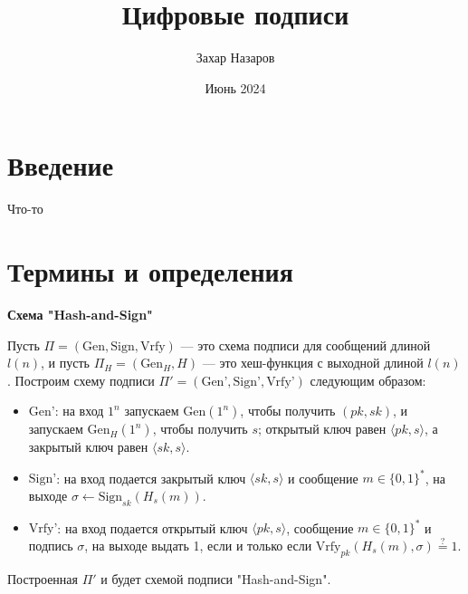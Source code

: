\documentclass[colorthm]{./civarticle}
\title{Цифровые подписи}
\author{Захар Назаров}
\date{Июнь 2024}
\begin{document}
\section{Введение}
Что-то

\section{Термины и определения}

\begin{definition}
    \textbf{Схема "Hash-and-Sign"}

    Пусть $\Pi = (\text{Gen}, \text{Sign}, \text{Vrfy})$ — это схема подписи для сообщений длиной $l(n)$, и пусть $\Pi_H = (\text{Gen}_H, H)$ — это хеш-функция с выходной длиной $l(n)$. Построим схему подписи $\Pi' = (\text{Gen'}, \text{Sign'}, \text{Vrfy'})$ следующим образом:
    \begin{itemize}
        \item $\text{Gen'}$: на вход $1^n$ запускаем $\text{Gen}(1^n)$, чтобы получить $(pk, sk)$, и запускаем $\text{Gen}_H(1^n)$, чтобы получить $s$; открытый ключ равен $\langle pk, s \rangle$, а закрытый ключ равен $\langle sk, s \rangle$.
        
        \item $\text{Sign'}$: на вход подается закрытый ключ $\langle sk, s \rangle$ и сообщение $m \in \{0, 1\}^*$, на выходе $\sigma \leftarrow \text{Sign}_{sk}(H_s(m))$.
        
        \item $\text{Vrfy'}$: на вход подается открытый ключ $\langle pk, s \rangle$, сообщение $m \in \{0, 1\}^*$ и подпись $\sigma$, на выходе выдать 1, если и только если $\text{Vrfy}_{pk}(H_s(m), \sigma) \stackrel{?}{=} 1$.
    \end{itemize}

    Построенная $\Pi'$ и будет схемой подписи "Hash-and-Sign".
\end{definition}
\end{document}
